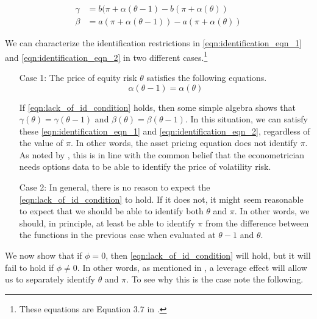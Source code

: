\documentclass[11pt, letterpaper, twoside, final]{article}
\begin{document}
\begin{align}
   \label{eqn:identification_eqn_1}
   \gamma  &= b(\pi + \alpha(\theta - 1) -  b(\pi + \alpha(\theta))  \\
%
    \label{eqn:identification_eqn_2}
    \beta &=   a(\pi + \alpha(\theta -1)) - a(\pi + \alpha(\theta)) 
\end{align}

We can characterize the identification restrictions in \cref{eqn:identification_eqn_1} and
\cref{eqn:identification_eqn_2} in two different cases.\footnote{These equations are Equation 3.7 in
\textcite{khrapov2016affine}.}

\begin{enumerate}
    \item[Case 1:] The price of equity risk $\theta$ satisfies the following equations. 
        \begin{equation}
            \alpha(\theta - 1) = \alpha(\theta)
            \label{eqn:lack_of_id_condition}
        \end{equation}

        If \cref{eqn:lack_of_id_condition} holds, then some simple algebra shows that $\gamma(\theta) =
        \gamma(\theta-1)$ and $\beta(\theta) = \beta(\theta-1)$.
        In this situation, we can satisfy these \cref{eqn:identification_eqn_1} and
        \cref{eqn:identification_eqn_2}, regardless of the value of $\pi$.
        In other words, the asset pricing equation does not identify $\pi$. 
        As noted by \textcite{khrapov2016affine}, this is in line with the common belief that the econometrician
        needs options data to be able to identify the price of volatility risk. 

    \item[Case 2:] 
        In general, there is no reason to expect the \cref{eqn:lack_of_id_condition} to hold.
        If it does not, it might seem reasonable to expect that we should be able to identify both $\theta$ and
        $\pi$.
        In other words, we should, in principle, at least be able to identify $\pi$ from the difference between the
        functions in the previous case when evaluated at $\theta-1$ and $\theta$.
\end{enumerate}

We now show that if $\phi = 0$, then \cref{eqn:lack_of_id_condition} will hold, but it will fail to hold if $\phi
\neq 0$.
In other words, as mentioned in \textcite[13]{khrapov2016affine}, a leverage effect will allow us to separately
identify $\theta$ and $\pi$.
To see why this is the case note the following.
\end{document}
